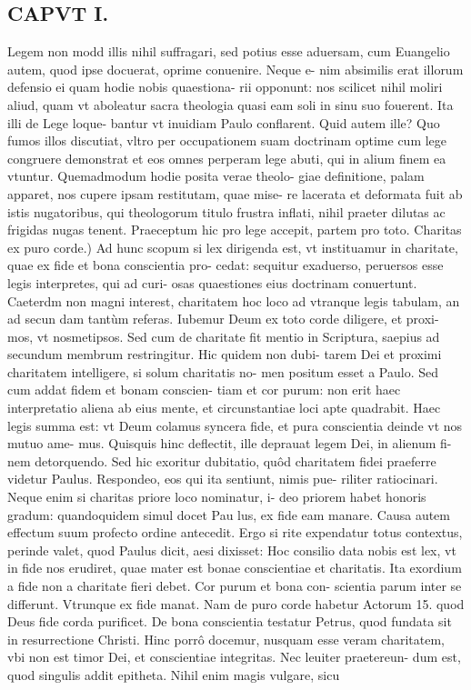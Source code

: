 \documentclass{article}
\begin{document}
\begin{pages}
\section*{CAPVT I. }
\marginpar{[ p.5 ]}\pstart Legem non modd illis nihil suffragari, sed potius esse aduersam, cum Euangelio autem, quod ipse docuerat, oprime conuenire. Neque e- nim absimilis erat illorum defensio ei quam hodie nobis quaestiona- rii opponunt: nos scilicet nihil moliri aliud, quam vt aboleatur sacra theologia quasi eam soli in sinu suo fouerent. Ita illi de Lege loque- bantur vt inuidiam Paulo conflarent. Quid autem ille? Quo fumos illos discutiat, vltro per occupationem suam doctrinam optime cum lege congruere demonstrat et eos omnes perperam lege abuti, qui in alium finem ea vtuntur. Quemadmodum hodie posita verae theolo- giae definitione, palam apparet, nos cupere ipsam restitutam, quae mise- re lacerata et deformata fuit ab istis nugatoribus, qui theologorum titulo frustra inflati, nihil praeter dilutas ac frigidas nugas tenent. Praeceptum hic pro lege accepit, partem pro toto.  \pend\pstart Charitas ex puro corde.) Ad hunc scopum si lex dirigenda est, vt instituamur in charitate, quae ex fide et bona conscientia pro- cedat: sequitur exaduerso, peruersos esse legis interpretes, qui ad curi- osas quaestiones eius doctrinam conuertunt. Caeterdm non magni interest, charitatem hoc loco ad vtranque legis tabulam, an ad secun dam tantùm referas. Iubemur Deum ex toto corde diligere, et proxi- mos, vt nosmetipsos. Sed cum de charitate fit mentio in Scriptura, saepius ad secundum membrum restringitur. Hic quidem non dubi- tarem Dei et proximi charitatem intelligere, si solum charitatis no- men positum esset a Paulo. Sed cum addat fidem et bonam conscien- tiam et cor purum: non erit haec interpretatio aliena ab eius mente, et circunstantiae loci apte quadrabit. Haec legis summa est: vt Deum colamus syncera fide, et pura conscientia deinde vt nos mutuo ame- mus. Quisquis hinc deflectit, ille deprauat legem Dei, in alienum fi- nem detorquendo. Sed hic exoritur dubitatio, quôd charitatem fidei praeferre videtur Paulus. Respondeo, eos qui ita sentiunt, nimis pue- riliter ratiocinari. Neque enim si charitas priore loco nominatur, i- deo priorem habet honoris gradum: quandoquidem simul docet Pau lus, ex fide eam manare. Causa autem effectum suum profecto ordine antecedit. Ergo si rite expendatur totus contextus, perinde valet, quod Paulus dicit, aesi dixisset: Hoc consilio data nobis est lex, vt in fide nos erudiret, quae mater est bonae conscientiae et charitatis. Ita exordium a fide non a charitate fieri debet. Cor purum et bona con- scientia parum inter se differunt. Vtrunque ex fide manat. Nam de puro corde habetur Actorum 15. quod Deus fide corda purificet. De bona conscientia testatur Petrus, quod fundata sit in resurrectione Christi. Hinc porrô docemur, nusquam esse veram charitatem, vbi non est timor Dei, et conscientiae integritas. Nec leuiter praetereun- dum est, quod singulis addit epitheta. Nihil enim magis vulgare, sicu  \pend

\end{pages}
\end{document}
